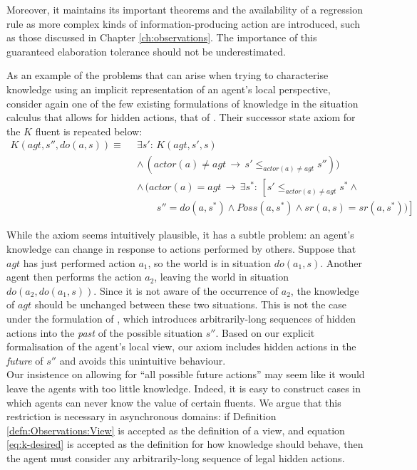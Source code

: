 Moreover, it maintains its important theorems and the availability
of a regression rule as more complex kinds of information-producing
action are introduced, such as those discussed in Chapter \ref{ch:observations}.
The importance of this guaranteed elaboration tolerance should not
be underestimated.

As an example of the problems that can arise when trying to characterise
knowledge using an implicit representation of an agent's local perspective,
consider again one of the few existing formulations of knowledge in
the situation calculus that allows for hidden actions, that of \citep{Lesperance99sitcalc_approach}.
Their successor state axiom for the $K$ fluent is repeated below:\begin{align*}
K(agt,s'',do(a,s))\equiv\,\,\, & \exists s':\, K(agt,s',s)\\
 & \wedge\,(actor(a)\neq agt\,\rightarrow\, s'\leq_{actor(a)\neq agt}s''))\\
 & \wedge\,(actor(a)=agt\,\rightarrow\,\exists s^{*}:\,\left[s'\leq_{actor(a)\neq agt}s^{*}\wedge\right.\\
 & \,\,\,\,\,\,\,\,\,\,\,\,\left.s''=do(a,s^{*})\wedge Poss(a,s^{*})\wedge sr(a,s)=sr(a,s^{*}))\right]\end{align*}


While the axiom seems intuitively plausible, it has a subtle problem:
an agent's knowledge can change in response to actions performed by
others. Suppose that $agt$ has just performed action $a_{1}$, so
the world is in situation $do(a_{1},s)$. Another agent then performs
the action $a_{2}$, leaving the world in situation $do(a_{2},do(a_{1},s))$.
Since it is not aware of the occurrence of $a_{2}$, the knowledge
of $agt$ should be unchanged between these two situations. This is
not the case under the formulation of \citep{Lesperance99sitcalc_approach},
which introduces arbitrarily-long sequences of hidden actions into
the \emph{past} of the possible situation $s''$. Based on our explicit
formalisation of the agent's local view, our axiom includes hidden
actions in the \emph{future} of $s''$ and avoids this unintuitive
behaviour.\\


Our insistence on allowing for {}``all possible future actions''
may seem like it would leave the agents with too little knowledge.
Indeed, it is easy to construct cases in which agents can never know
the value of certain fluents. We argue that this restriction is necessary
in asynchronous domains: if Definition \ref{defn:Observations:View}
is accepted as the definition of a view, and equation \eqref{eq:k-desired}
is accepted as the definition for how knowledge should behave, then
the agent must consider any arbitrarily-long sequence of legal hidden
actions.

